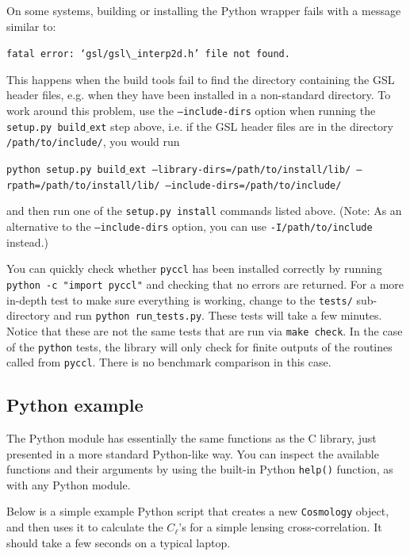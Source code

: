 \documentclass[\docopts]{\docclass}
\begin{document}
On some systems, building or installing the Python wrapper fails with a message similar to:

\texttt{fatal error: `gsl/gsl$\_$interp2d.h' file not found.}

This happens when the build tools fail to find the directory containing the GSL header files, e.g. when they have been installed in a non-standard directory. To work around this problem, use the {\tt --include-dirs} option when running the {\tt setup.py build$\_$ext} step above, i.e. if the GSL header files are in the directory {\tt /path/to/include/}, you would run

\texttt{python setup.py build$\_$ext --library-dirs=/path/to/install/lib/ --rpath=/path/to/install/lib/ --include-dirs=/path/to/include/}

and then run one of the {\tt setup.py install} commands listed above. (Note: As an alternative to the {\tt --include-dirs} option, you can use {\tt -I/path/to/include} instead.)

You can quickly check whether {\tt pyccl} has been installed correctly by running {\tt python -c "import pyccl"} and checking that no errors are returned. For a more in-depth test to make sure everything is working, change to the {\tt tests/} sub-directory and run {\tt python run$\_$tests.py}. These tests will take a few minutes. Notice that these are not the same tests that are run via {\tt make check}. In the case of the {\tt python} tests, the library will only check for finite outputs of the routines called from {\tt pyccl}. There is no benchmark comparison in this case.
 
\subsection{Python example}
\label{sec:python:example}

The Python module has essentially the same functions as the C library, just presented in a more standard Python-like way. You can inspect the available functions and their arguments by using the built-in Python {\tt help()} function, as with any Python module.

Below is a simple example Python script that creates a new {\tt Cosmology} object, and then uses it to calculate the $C_\ell$'s for a simple lensing cross-correlation. It should take a few seconds on a typical laptop.
\end{document}
